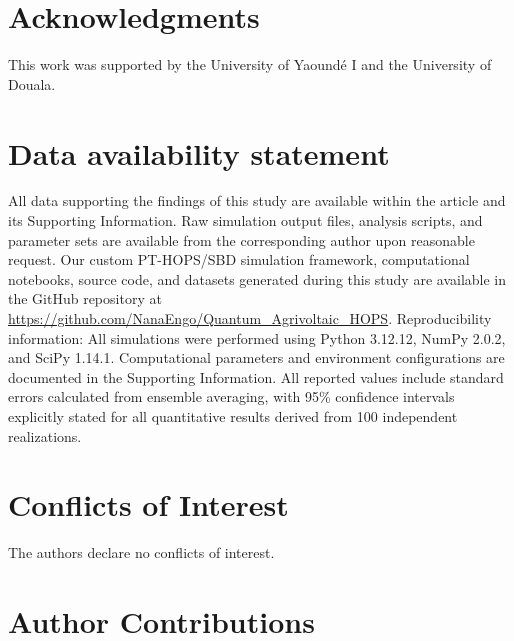 \documentclass[11pt,a4paper]{article}
\begin{document}
\section*{Acknowledgments}

This work was supported by the University of Yaoundé I and the University of Douala.


\section*{Data availability statement}

All data supporting the findings of this study are available within the article and its Supporting Information. Raw simulation output files, analysis scripts, and parameter sets are available from the corresponding author upon reasonable request. Our custom PT-HOPS/SBD simulation framework, computational notebooks, source code, and datasets generated during this study are available in the GitHub repository at \url{https://github.com/NanaEngo/Quantum_Agrivoltaic_HOPS}. Reproducibility information: All simulations were performed using Python 3.12.12, NumPy 2.0.2, and SciPy 1.14.1. Computational parameters and environment configurations are documented in the Supporting Information. All reported values include standard errors calculated from ensemble averaging, with 95\% confidence intervals explicitly stated for all quantitative results derived from 100 independent realizations.


\section*{Conflicts of Interest}

The authors declare no conflicts of interest.


\section*{Author Contributions}
\end{document}
